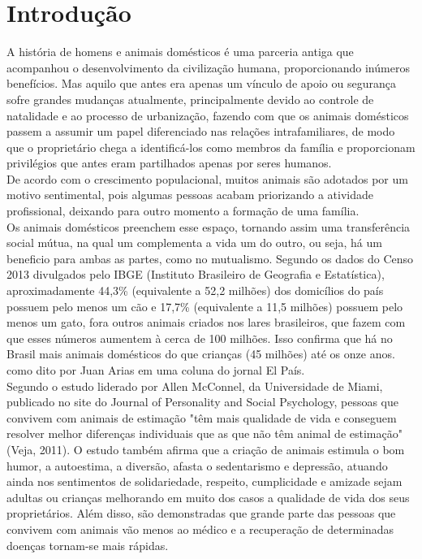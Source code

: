 \chapter{Introdução}
\setcounter{page}{11}
A história de homens e animais domésticos é uma parceria antiga que acompanhou o desenvolvimento da civilização humana, proporcionando inúmeros benefícios. Mas aquilo que antes era apenas um vínculo de apoio ou segurança sofre grandes mudanças atualmente, principalmente devido ao controle de natalidade e ao processo de urbanização, fazendo com que os animais domésticos passem a assumir um papel diferenciado nas relações intrafamiliares, de modo que o proprietário chega a identificá-los como membros da família e proporcionam privilégios que antes eram partilhados apenas por seres humanos.
\\
\indent
De acordo com o crescimento populacional, muitos animais são adotados por um motivo sentimental, pois algumas pessoas acabam priorizando a atividade profissional, deixando para outro momento a formação de uma família.
\\
\indent
Os animais domésticos preenchem esse espaço, tornando assim uma transferência social mútua, na qual um complementa a vida um do outro, ou seja, há um beneficio para ambas as partes, como no mutualismo. Segundo os dados do Censo 2013 divulgados pelo IBGE (Instituto Brasileiro de Geografia e Estatística), aproximadamente 44,3\% (equivalente a 52,2 milhões) dos domicílios do país possuem pelo menos um cão e 17,7\% (equivalente a 11,5 milhões) possuem pelo menos um gato, fora outros animais criados nos lares brasileiros, que fazem com que esses números aumentem à cerca de 100 milhões. Isso confirma que há no Brasil mais animais domésticos do que crianças (45 milhões) até os onze anos. como dito por Juan Arias em uma coluna do jornal El País.
\\
\indent
Segundo o estudo liderado por Allen McConnel, da Universidade de Miami, publicado no site do Journal of Personality and Social Psychology, pessoas que convivem com animais de estimação "têm mais qualidade de vida e conseguem resolver melhor diferenças individuais que as que não têm animal de estimação" (Veja, 2011). O estudo também afirma que a criação de animais estimula o bom humor, a autoestima, a diversão,  afasta o sedentarismo e depressão, atuando ainda nos sentimentos de solidariedade, respeito, cumplicidade e amizade sejam adultas ou crianças melhorando em muito dos casos a qualidade de vida dos seus proprietários. Além disso, são demonstradas que grande parte das pessoas que convivem com animais vão menos ao médico e a recuperação de determinadas doenças tornam-se mais rápidas. 
